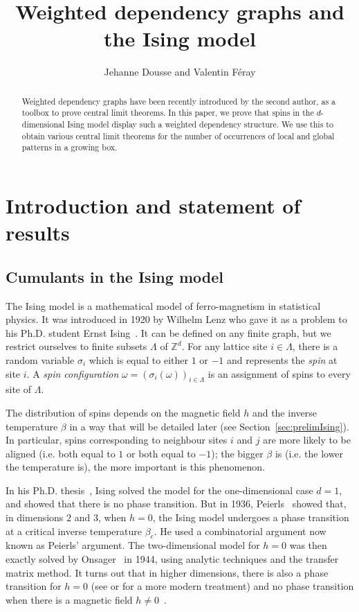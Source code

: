 \documentclass{amsart}
\title{Weighted dependency graphs and the Ising model}
\author{Jehanne Dousse and Valentin F\'eray}
\newcommand{\field}[1]{\mathbb{#1}}
\newcommand{\Z}{\field{Z}}
\numberwithin{equation}{section}
\theoremstyle{remark}
\begin{document}
\begin{abstract}
  Weighted dependency graphs have been recently introduced by the second author,
  as a toolbox to prove central limit theorems.
  In this paper, we prove that spins in the $d$-dimensional Ising model 
  display such a weighted dependency structure.
  We use this to obtain various central limit theorems
  for the number of occurrences of local and global patterns
  in a growing box.
\end{abstract}

\maketitle

\section{Introduction and statement of results}
\subsection{Cumulants in the Ising model}
The Ising model is a mathematical model of ferro-magnetism in statistical physics. It was introduced in 1920 by Wilhelm Lenz who gave it as a problem to his Ph.D. student Ernst Ising~\cite{Ising}. It can be defined on any finite graph, but we restrict ourselves to finite subsets $\Lambda$ of $\Z^d$.
For any lattice site $i \in \Lambda$, there is a random variable $\sigma_i$ which is equal to either $1$ or $-1$ and represents the {\em spin} at site $i$. A \emph{spin configuration} $\omega = (\sigma_i (\omega))_{i \in \Lambda}$ is an assignment of spins to every site of $\Lambda$.

The distribution of spins depends on the magnetic field $h$ and the inverse temperature $\beta$ in a way that will be detailed later (see Section~\ref{sec:prelimIsing}).
In particular, spins corresponding to neighbour sites $i$ and $j$ are more likely to be aligned (i.e. both equal to $1$ or both equal to $-1$);
the bigger $\beta$ is (i.e. the lower the temperature is), the more important is this phenomenon.

In his Ph.D. thesis~\cite{Ising}, Ising solved the model for the one-dimensional case $d=1$, and showed that there is no phase transition. But in 1936, Peierls~\cite{Peierls} showed that, in dimensions $2$ and $3$, when $h=0$, the Ising model undergoes a phase transition at a critical inverse temperature $\beta_c$. He used a combinatorial argument now known as Peierls' argument. The two-dimensional model for $h=0$ was then exactly solved by Onsager~\cite{Onsager} in 1944, using analytic techniques and the transfer matrix method. It turns out that in higher dimensions, there is also a phase transition for $h=0$ (see \cite{Peierls} or
\cite{Velenik} for a more modern treatment)
and no phase transition when there is a magnetic field $h \neq 0$~\cite{LeeYang,Yang}.
\end{document}
